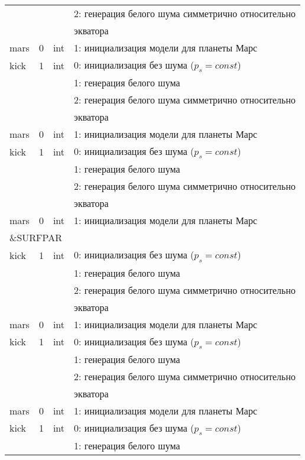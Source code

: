\begin{longtable}[c]{|l|c|l|l|}
          &   &     & 2: генерация белого шума симметрично относительно \\
      & & & экватора    \\
     mars & 0 & int & 1: инициализация модели для планеты Марс     \\
    kick & 1 & int & 0: инициализация без шума ($p_s = const$) \\
          &   &     & 1: генерация белого шума                  \\
          &   &     & 2: генерация белого шума симметрично относительно \\
      & & & экватора    \\
     mars & 0 & int & 1: инициализация модели для планеты Марс     \\
    kick & 1 & int & 0: инициализация без шума ($p_s = const$) \\
          &   &     & 1: генерация белого шума                  \\
          &   &     & 2: генерация белого шума симметрично относительно \\
      & & & экватора    \\
     mars & 0 & int & 1: инициализация модели для планеты Марс     \\
     \hline
     \multicolumn{4}{|l|}{\&SURFPAR}        \\ \hline
    kick & 1 & int & 0: инициализация без шума ($p_s = const$) \\
          &   &     & 1: генерация белого шума                  \\
          &   &     & 2: генерация белого шума симметрично относительно \\
      & & & экватора    \\
     mars & 0 & int & 1: инициализация модели для планеты Марс     \\
    kick & 1 & int & 0: инициализация без шума ($p_s = const$) \\
          &   &     & 1: генерация белого шума                  \\
          &   &     & 2: генерация белого шума симметрично относительно \\
      & & & экватора    \\
     mars & 0 & int & 1: инициализация модели для планеты Марс     \\
    kick & 1 & int & 0: инициализация без шума ($p_s = const$) \\
          &   &     & 1: генерация белого шума                  \\

\end{longtable}
